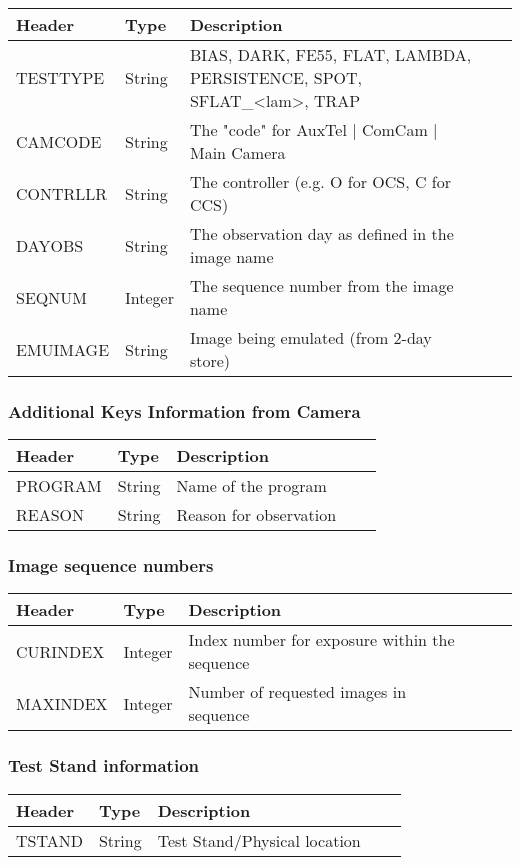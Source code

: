 \begin{tabular}{l l l l l}
\hline
Header & Type & Description \\
\hline
TESTTYPE & String & BIAS, DARK, FE55, FLAT, LAMBDA, PERSISTENCE, SPOT, SFLAT\_<lam>, TRAP \\
CAMCODE & String & The "code" for AuxTel | ComCam | Main Camera \\
CONTRLLR & String & The controller (e.g. O for OCS, C for CCS) \\
DAYOBS & String & The observation day as defined in the image name  \\
SEQNUM & Integer & The sequence number from the image name \\
EMUIMAGE & String & Image being emulated (from 2-day store) \\
\hline
\end{tabular}


\subsubsection{Additional Keys Information from Camera}


\begin{tabular}{l l l l l}
\hline
Header & Type & Description \\
\hline
PROGRAM & String & Name of the program \\
REASON & String & Reason for observation \\
\hline
\end{tabular}


\subsubsection{Image sequence numbers}


\begin{tabular}{l l l l l}
\hline
Header & Type & Description \\
\hline
CURINDEX & Integer & Index number for exposure within the sequence \\
MAXINDEX & Integer & Number of requested images in sequence \\
\hline
\end{tabular}


\subsubsection{Test Stand information}


\begin{tabular}{l l l l l}
\hline
Header & Type & Description \\
\hline
TSTAND & String & Test Stand/Physical location \\
\hline
\end{tabular}


